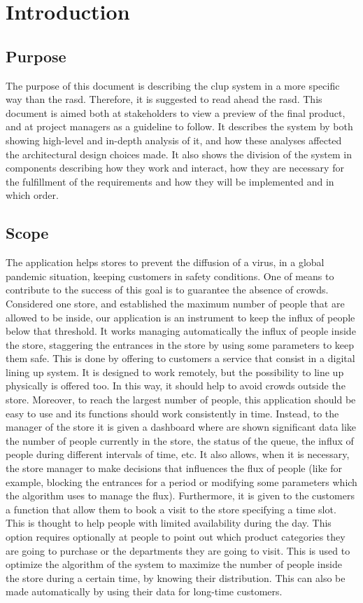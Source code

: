 \chapter{Introduction}


\section{Purpose}
The purpose of this document is describing the \gls{clup} system in a more specific way than the \gls{rasd}.
Therefore, it is suggested to read ahead the \gls{rasd}. This document is aimed both at stakeholders to view a preview of the final product, and at project managers as a guideline to follow.
It describes the system by both showing high-level and in-depth analysis of it, and how these analyses affected the architectural design choices made. It also shows the division of the system in components describing how they work and interact, how they are necessary for the fulfillment of the requirements and how they will be implemented and in which order.


\section{Scope}
The application helps stores to prevent the diffusion of a virus, in a global pandemic situation, keeping customers in safety conditions.
One of means to contribute to the success of this goal is to guarantee the absence of crowds.
Considered one store, and established the maximum number of people that are allowed to be inside, our application is an instrument to keep the influx of people below that threshold.
It works managing automatically the influx of people inside the store, staggering the entrances in the store by using some parameters to keep them safe.
This is done by offering to customers a service that consist in a digital lining up system. It is designed to work remotely, but the possibility to line up physically is offered too. In this way, it should help to avoid crowds outside the store.
Moreover, to reach the largest number of people, this application should be easy to use and its functions should work consistently in time.
Instead, to the manager of the store it is given a dashboard where are shown significant data like the number of people currently in the store, the status of the queue, the influx of people during different intervals of time, etc. It also allows, when it is necessary, the store manager to make decisions that influences the flux of people (like for example, blocking the entrances for a period or modifying some parameters which the algorithm uses to manage the flux).
Furthermore, it is given to the customers a function that allow them to book a visit to the store specifying a time slot. This is thought to help people with limited availability during the day.
This option requires optionally at people to point out which product categories they are going to purchase or the departments they are going to visit. This is used to optimize the algorithm of the system to maximize the number of people inside the store during a certain time, by knowing their distribution. This can also be made automatically by using their data for long-time customers.


